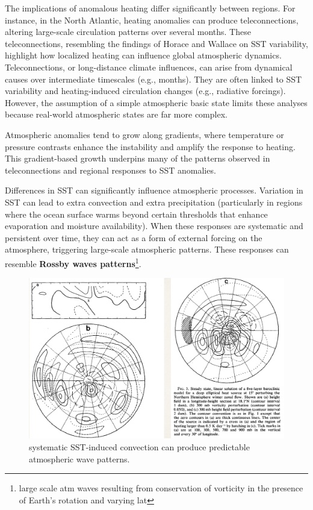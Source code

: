 The implications of anomalous heating differ significantly between regions. For instance, in the North Atlantic, heating anomalies can produce teleconnections, altering large-scale circulation patterns over several months. These teleconnections, resembling the findings of Horace and Wallace on SST variability, highlight how localized heating can influence global atmospheric dynamics.\\
[0.25cm]


Teleconnections, or long-distance climate influences, can arise from dynamical causes over intermediate timescales (e.g., months). They are often linked to SST variability and heating-induced circulation changes (e.g., radiative forcings). However, the assumption of a simple atmospheric basic state limits these analyses because real-world atmospheric states are far more complex.

Atmospheric anomalies tend to grow along gradients, where temperature or pressure contrasts enhance the instability and amplify the response to heating. This gradient-based growth underpins many of the patterns observed in teleconnections and regional responses to SST anomalies.


Differences in SST can significantly influence atmospheric processes. Variation in SST can lead to extra convection and extra precipitation (particularly in regions where the ocean surface warms beyond certain thresholds that enhance evaporation and moisture availability). When these responses are systematic and persistent over time, they can act as a form of external forcing on the atmosphere, triggering large-scale atmospheric patterns. These responses can resemble \textbf{Rossby waves patterns}\footnote{large scale atm waves resulting from conservation of vorticity in the presence of Earth's rotation and varying lat}.

\begin{figure}[htpb]
    \centering
    \includegraphics[width=0.5\linewidth]{uploads/imagewavesconn.png}
    \caption{systematic SST-induced convection can produce predictable atmospheric wave patterns.}
    
\end{figure}
